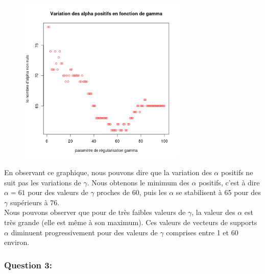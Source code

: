 \documentclass[a4paper, 10pt]{article}
\begin{document}
\newpage
\begin{figure}[h!]
	\centering
  \includegraphics[height = 8cm, width = 8cm]{plots/ex4_q2_alpha_positifs.png}\\
\end{figure}
\noindent
En observant ce graphique, nous pouvons dire que la variation des $\alpha$ positifs ne suit pas les variations de $\gamma$.
Nous obtenons le minimum des $\alpha$ positifs, c'est à dire $\alpha = 61$ pour des valeurs de $\gamma$ proches de 60,
puis les $\alpha$ se stabilisent à 65 pour des $\gamma$ supérieurs à 76.\\
Nous pouvons observer que pour de très faibles valeurs de $\gamma$, la valeur des $\alpha$ est très grande (elle est même à son maximum). Ces valeurs de vecteurs de supports $\alpha$ diminuent progressivement pour des valeurs de $\gamma$ comprises entre 1 et 60 environ.

\subsubsection*{Question 3:}
\end{document}
